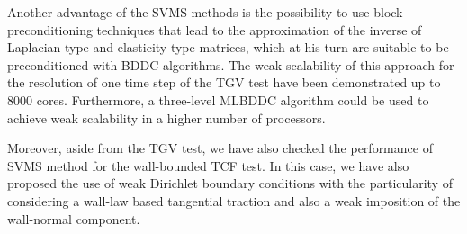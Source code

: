 Another advantage of the SVMS methods is the possibility to use block preconditioning techniques that lead to the approximation of the inverse of Laplacian-type and elasticity-type matrices, which at his turn are suitable to be preconditioned with BDDC algorithms. The weak scalability of this approach for the resolution of one time step of the TGV test have been demonstrated up to 8000 cores. Furthermore, a three-level MLBDDC algorithm could be used to achieve weak scalability in a higher number of processors.

Moreover, aside from the TGV test, we have also checked the performance of SVMS method for the wall-bounded TCF test. In this case, we have also proposed the use of weak Dirichlet boundary conditions with the particularity of considering a wall-law based tangential traction and also a weak imposition of the wall-normal component.